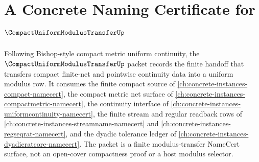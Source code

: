 \chapter{A Concrete Naming Certificate for $\CompactUniformModulusTransferUp$}
\label{ch:concrete-instances-compact-uniform-modulus-transfer-namecert}

Following Bishop-style compact metric uniform continuity, the $\CompactUniformModulusTransferUp$ packet records the finite handoff that transfers compact finite-net and pointwise continuity data into a uniform modulus row. It consumes the finite compact source of \autoref{ch:concrete-instances-compact-namecert}, the compact metric net surface of \autoref{ch:concrete-instances-compactmetric-namecert}, the continuity interface of \autoref{ch:concrete-instances-uniformcontinuity-namecert}, the finite stream and regular readback rows of \autoref{ch:concrete-instances-streamname-namecert} and \autoref{ch:concrete-instances-regseqrat-namecert}, and the dyadic tolerance ledger of \autoref{ch:concrete-instances-dyadicratcore-namecert}. The packet is a finite modulus-transfer NameCert surface, not an open-cover compactness proof or a host modulus selector.

